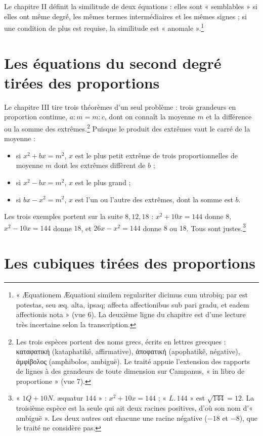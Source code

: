 \documentclass[11pt,a4paper]{article}
\begin{document}
Le chapitre II définit la similitude de deux équations : elles sont
« semblables » si elles ont même degré, les mêmes termes intermédiaires et les
mêmes signes ; si une condition de plus est requise, la similitude est
« anomale ».\footnote{« Æquationem Æquationi similem regulariter dicimus cum
utrobiq; par est potestas, seu æq. alta, ipsaq; affecta affectionibus sub pari
gradu, et eadem affectionis nota » (vue 6). La deuxième ligne du chapitre est
d'une lecture très incertaine selon la transcription.}

\section*{Les équations du second degré tirées des proportions}

Le chapitre III tire trois théorèmes d'un seul problème : trois grandeurs en
proportion continue, $a : m = m : c$, dont on connaît la moyenne $m$ et la
différence ou la somme des extrêmes.\footnote{Les trois espèces portent des noms
grecs, écrits en lettres grecques : καταφατική (kataphatikê, affirmative),
ἀποφατική (apophatikê, négative), ἀμφίβολος (amphibolos, ambiguë). Le traité appuie l'extension des rapports de
lignes à des grandeurs de toute dimension sur Campanus, « in libro de
proportione » (vue 7).} Puisque le produit des extrêmes vaut le carré de la
moyenne :

\begin{itemize}
  \item si $x^2 + bx = m^2$, $x$ est le plus petit extrême de trois
    proportionnelles de moyenne $m$ dont les extrêmes diffèrent de $b$ ;
  \item si $x^2 - bx = m^2$, $x$ est le plus grand ;
  \item si $bx - x^2 = m^2$, $x$ est l'un ou l'autre des extrêmes, dont la somme
    est $b$.
\end{itemize}

Les trois exemples portent sur la suite $8, 12, 18$ : $x^2 + 10x = 144$ donne
$8$, $x^2 - 10x = 144$ donne $18$, et $26x - x^2 = 144$ donne $8$ ou $18$. Tous
sont justes.\footnote{« $1Q + 10N.$ æquatur $144$ » : $x^2 + 10x = 144$ ; « $L.\,144$ »
est $\sqrt{144} = 12$. La troisième espèce est la seule qui ait deux racines
positives, d'où son nom d'« ambiguë ». Les deux autres ont chacune une racine
négative ($-18$ et $-8$), que le traité ne considère pas.}

\section*{Les cubiques tirées des proportions}
\end{document}
